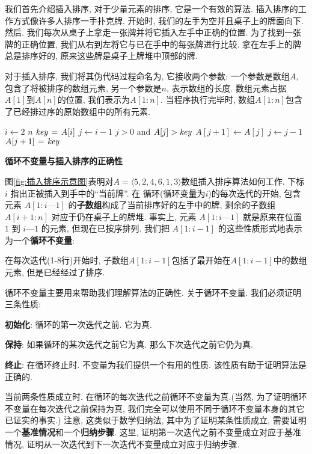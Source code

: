 \documentclass[oneside,10pt,fontset=none]{ctexbook}
\begin{document}
我们首先介绍插入排序, 对于少量元素的排序, 它是一个有效的算法. 插入排序的工作方式像许多人排序一手扑克牌. 开始时, 我们的左手为空并且桌子上的牌面向下. 然后. 我们每次从桌子上拿走一张牌并将它插入左手中正确的位置. 为了找到一张牌的正确位置, 我们从右到左将它与已在手中的每张牌进行比较. 拿在左手上的牌总是排序好的, 原来这些牌是桌子上牌堆中顶部的牌.

对于插入排序, 我们将其伪代码过程命名为, 它接收两个参数: 一个参数是数组$A$, 包含了将被排序的数组元素, 另一个参数是$n$, 表示数组的长度. 数组元素占据$A[1]$到$A[n]$的位置, 我们表示为$A[1:n]$. 当程序执行完毕时, 数组$A[1:n]$包含了已经排过序的原始数组中的所有元素.

\begin{codebox}
\li \For $i \gets 2$ \To $n$
\li \Do
$\id{key} \gets A[i]$
\li {}
\li $j \gets i-1$
\li \While $j > 0$ and $A[j] > \id{key}$
\li \Do
$A[j+1] \gets A[j]$
\li $j \gets j-1$
\End
\li $A[j+1] \gets \id{key}$
\End
\end{codebox}

\textbf{循环不变量与插入排序的正确性}

图\ref{fig:插入排序示意图}表明对$A=\langle 5, 2, 4, 6, 1, 3\rangle$数组插入排序算法如何工作. 下标 $i$ 指出正被插入到手中的``当前牌''. 在  循环(循环变量为$i$)的每次迭代的开始, 包含元素 $A[1:i—1]$ 的\textbf{子数组}构成了当前排序好的左手中的牌, 剩余的子数组 $A[i+1:n]$ 对应于仍在桌子上的牌堆. 事实上, 元素 $A[1:i—1]$ 就是原来在位置 $1$ 到 $i—1$ 的元素, 但现在已按序排列. 我们把 $A[1:i-1]$ 的这些性质形式地表示为一个\textbf{循环不变量}:



在每次迭代(1-8行)开始时, 子数组$A[1:i-1]$包括了最开始在$A[1:i-1]$中的数组元素, 但是已经经过了排序.

循环不变量主要用来帮助我们理解算法的正确性. 关于循环不变量. 我们必须证明三条性质:

\textbf{初始化}: 循环的第一次迭代之前. 它为真.

\textbf{保持}: 如果循环的某次迭代之前它为真. 那么下次迭代之前它仍为真.

\textbf{终止}: 在循环终止时. 不变量为我们提供一个有用的性质. 该性质有助于证明算法是正确的.

当前两条性质成立时. 在循环的每次迭代之前循环不变量为真.(当然, 为了证明循环不变量在每次迭代之前保持为真, 我们完全可以使用不同于循环不变量本身的其它已证实的事实.) 注意, 这类似于数学归纳法, 其中为了证明某条性质成立, 需要证明一个\textbf{基准情况}和一个\textbf{归纳步骤}. 这里, 证明第一次迭代之前不变量成立对应于基准情况, 证明从一次迭代到下一次迭代不变量成立对应于归纳步骤.
\end{document}
